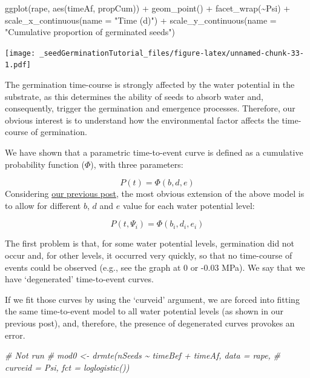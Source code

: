 \documentclass[
]{book}
\newenvironment{Shaded}{\begin{snugshade}}{\end{snugshade}}
\newcommand{\AttributeTok}[1]{\textcolor[rgb]{0.77,0.63,0.00}{#1}}
\newcommand{\CommentTok}[1]{\textcolor[rgb]{0.56,0.35,0.01}{\textit{#1}}}
\newcommand{\FunctionTok}[1]{\textcolor[rgb]{0.00,0.00,0.00}{#1}}
\newcommand{\NormalTok}[1]{#1}
\newcommand{\SpecialCharTok}[1]{\textcolor[rgb]{0.00,0.00,0.00}{#1}}
\newcommand{\StringTok}[1]{\textcolor[rgb]{0.31,0.60,0.02}{#1}}
\begin{document}
\begin{Shaded}
\begin{Highlighting}[]
\FunctionTok{ggplot}\NormalTok{(rape, }\FunctionTok{aes}\NormalTok{(timeAf, propCum)) }\SpecialCharTok{+}
  \FunctionTok{geom\_point}\NormalTok{() }\SpecialCharTok{+}
  \FunctionTok{facet\_wrap}\NormalTok{(}\SpecialCharTok{\textasciitilde{}}\NormalTok{Psi) }\SpecialCharTok{+}
  \FunctionTok{scale\_x\_continuous}\NormalTok{(}\AttributeTok{name =} \StringTok{"Time (d)"}\NormalTok{) }\SpecialCharTok{+}
  \FunctionTok{scale\_y\_continuous}\NormalTok{(}\AttributeTok{name =} \StringTok{"Cumulative proportion of germinated seeds"}\NormalTok{)}
\end{Highlighting}
\end{Shaded}

\texttt{[image: \_seedGerminationTutorial\_files/figure-latex/unnamed-chunk-33-1.pdf]}

The germination time-course is strongly affected by the water potential in the substrate, as this determines the ability of seeds to absorb water and, consequently, trigger the germination and emergence processes. Therefore, our obvious interest is to understand how the environmental factor affects the time-course of germination.

We have shown that a parametric time-to-event curve is defined as a cumulative probability function (\(\Phi\)), with three parameters:

\[P(t) = \Phi \left( b, d, e \right)\]
Considering \href{https://www.statforbiology.com/2021/stat_drcte_5-comparinglots/}{our previous post}, the most obvious extension of the above model is to allow for different \(b\), \(d\) and \(e\) value for each water potential level:

\[P(t, \Psi_i) = \Phi \left( b_i, d_i, e_i \right)\]

The first problem is that, for some water potential levels, germination did not occur and, for other levels, it occurred very quickly, so that no time-course of events could be observed (e.g., see the graph at 0 or -0.03 MPa). We say that we have `degenerated' time-to-event curves.

If we fit those curves by using the `curveid' argument, we are forced into fitting the same time-to-event model to all water potential levels (as shown in our previous post), and, therefore, the presence of degenerated curves provokes an error.

\begin{Shaded}
\begin{Highlighting}[]
\CommentTok{\# Not run}
\CommentTok{\# mod0 \textless{}{-} drmte(nSeeds \textasciitilde{} timeBef + timeAf, data = rape,}
\CommentTok{\#              curveid = Psi, fct = loglogistic())}
\end{Highlighting}
\end{Shaded}
\end{document}
